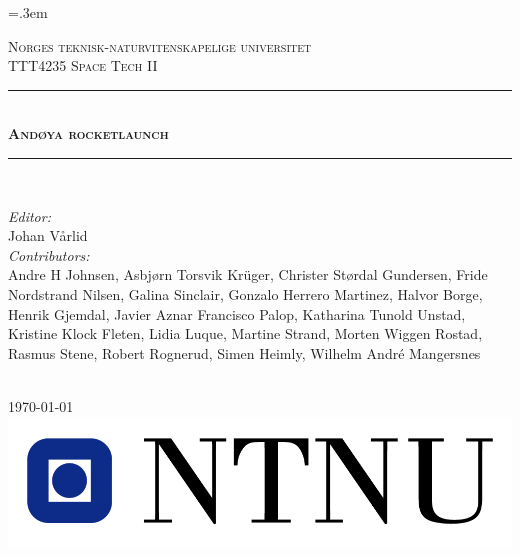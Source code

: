 \documentclass[a4paper]{report}
\begin{document}
\begingroup\emergencystretch=.3em
\begin{titlepage}
    \newcommand{\HRule}{\rule{\linewidth}{0.5mm}} %
    
    \center %
    
    \textsc{\LARGE Norges teknisk-naturvitenskapelige universitet}\\[1.5cm] %
    \textsc{\Large TTT4235 Space Tech II}\\[0.5cm] %
    
    \HRule \\[0.7cm]
    { \huge \bfseries \textsc{Andøya rocketlaunch}}\\[0.4cm]
    \HRule \\[1.5cm]
    
    \begin{minipage}{0.75\textwidth}
        \emph{Editor:}\\
        Johan Vårlid\\
        \emph{Contributors:}\\
        Andre H Johnsen, Asbjørn Torsvik Krüger, Christer Størdal Gundersen, Fride Nordstrand Nilsen, Galina Sinclair, Gonzalo Herrero Martinez, Halvor Borge, Henrik Gjemdal, Javier Aznar Francisco Palop, Katharina Tunold Unstad, Kristine Klock Fleten, Lidia Luque, Martine Strand, Morten Wiggen Rostad, Rasmus Stene, Robert Rognerud, Simen Heimly, Wilhelm André Mangersnes
        \end{minipage}
    
    ~
    \newline\\
    {\large \today}\\[2cm]
    
    
    \includegraphics[scale=1]{General/figures/ntnu-logo.jpg}\\[1cm] 
    \vfill %

\end{titlepage}
\end{document}
